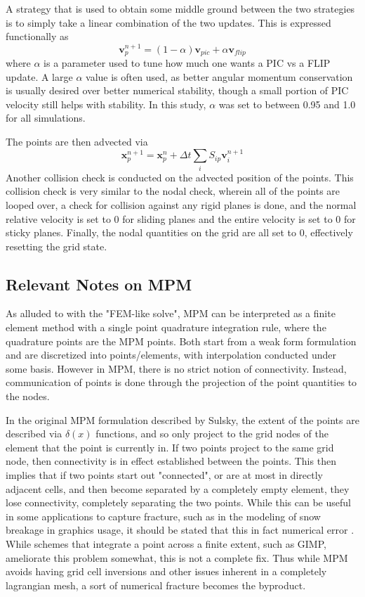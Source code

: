 A strategy that is used to obtain some middle ground between the two strategies is to simply take a linear combination of the two updates. This is expressed functionally as
\begin{equation}
\bm{v}^{n+1}_p=(1-\alpha)\bm{v}_{pic} + \alpha \bm{v}_{flip}
\end{equation}
where $\alpha$ is a parameter used to tune how much one wants a PIC vs a FLIP update. A large $\alpha$ value is often used, as better angular momentum conservation is usually desired over better numerical stability, though a small portion of PIC velocity still helps with stability. In this study, $\alpha$ was set to between 0.95 and 1.0 for all simulations. 

The points are then advected via
\begin{equation}
\bm{x}^{n+1}_p=\bm{x}^n_p+\Delta t\sum_{i}S_{ip}\bm{v}^{n+1}_i
\end{equation}
Another collision check is conducted on the advected position of the points. This collision check is very similar to the nodal check, wherein all of the points are looped over, a check for collision against any rigid planes is done, and the normal relative velocity is set to 0 for sliding planes and the entire velocity is set to 0 for sticky planes. Finally, the nodal quantities on the grid are all set to 0, effectively resetting the grid state.

\subsection{Relevant Notes on MPM}
As alluded to with the "FEM-like solve", MPM can be interpreted as a finite element method with a single point quadrature integration rule, where the quadrature points are the MPM points. Both start from a weak form formulation and are discretized into points/elements, with interpolation conducted under some basis. However in MPM, there is no strict notion of connectivity. Instead, communication of points is done through the projection of the point quantities to the nodes.

In the original MPM formulation described by Sulsky, the extent of the points are described via $\delta(x)$ functions, and so only project to the grid nodes of the element that the point is currently in. If two points project to the same grid node, then connectivity is in effect established between the points. This then implies that if two points start out "connected", or are at most in directly adjacent cells, and then become separated by a completely empty element, they lose connectivity, completely separating the two points. While this can be useful in some applications to capture fracture, such as in the modeling of snow breakage in graphics usage, it should be stated that this in fact numerical error \cite{Stomakhin:2013:MPM}. While schemes that integrate a point across a finite extent, such as GIMP, ameliorate this problem somewhat, this is not a complete fix. Thus while MPM avoids having grid cell inversions and other issues inherent in a completely lagrangian mesh, a sort of numerical fracture becomes the byproduct.

